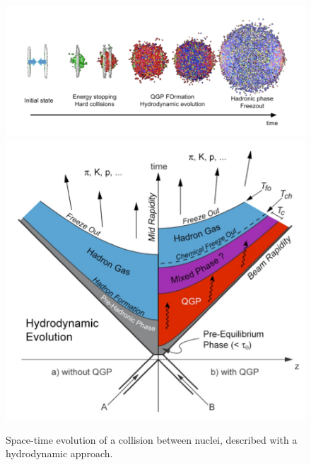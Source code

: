 \begin{figure}
  \centering
  \includegraphics[scale=0.5]{figures/evolution.png}
  \includegraphics[scale=0.35]{figures/spacetime.png}
  \caption{Space-time evolution of a collision between nuclei, described with a hydrodynamic approach.}
  \label{fig:evol}
\end{figure}
%
\clearpage
